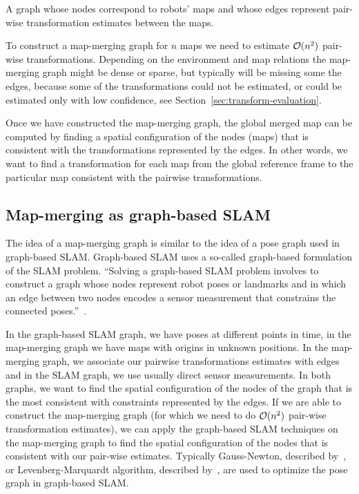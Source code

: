 \begin{defn}
    \label{def:map-merging-graph}
    A graph whose nodes correspond to robots' maps and whose edges represent pair-wise transformation estimates between the maps.
\end{defn}

To construct a map-merging graph for $n$ maps we need to estimate $\operatorname{\mathcal{O}}(n^2)$ pair-wise transformations. Depending on the environment and map relations the map-merging graph might be dense or sparse, but typically will be missing some the edges, because some of the transformations could not be estimated, or could be estimated only with low confidence, see Section~\ref{sec:transform-evaluation}.

Once we have constructed the map-merging graph, the global merged map can be computed by finding a spatial configuration of the nodes (maps) that is consistent with the transformations represented by the edges. In other words, we want to find a transformation for each map from the global reference frame to the particular map consistent with the pairwise transformations.

\subsection{Map-merging as graph-based SLAM}

The idea of a map-merging graph is similar to the idea of a pose graph used in graph-based \gls{SLAM}. Graph-based \gls{SLAM} uses a so-called graph-based formulation of the \gls{SLAM} problem. ``Solving a graph-based \gls{SLAM} problem involves to construct a graph whose nodes represent robot poses or landmarks and in which an edge between two nodes encodes a sensor measurement that constrains the connected poses.''~\citep{grisetti2010tutorial}.

In the graph-based \gls{SLAM} graph, we have poses at different points in time, in the map-merging graph we have maps with origins in unknown positions. In the map-merging graph, we associate our pairwise transformations estimates with edges and in the \gls{SLAM} graph, we use usually direct sensor measurements. In both graphs, we want to find the spatial configuration of the nodes of the graph that is the most consistent with constraints represented by the edges. If we are able to construct the map-merging graph (for which we need to do $\operatorname{\mathcal{O}}(n^2)$ pair-wise transformation estimates), we can apply the graph-based \gls{SLAM} techniques on the map-merging graph to find the spatial configuration of the nodes that is consistent with our pair-wise estimates. Typically Gauss-Newton, described by~\citet{fletcher2013practical}, or Levenberg-Marquardt algorithm, described by~\citet{more1978levmarq}, are used to optimize the pose graph in graph-based \gls{SLAM}.

